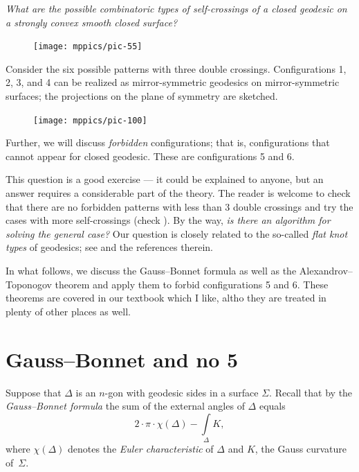 \documentclass[oneside,a4paper]{amsart}
\begin{document}
\medskip

\emph{What are the possible combinatoric types of self-crossings of a closed geodesic on a strongly convex smooth closed surface?}

\begin{figure}[ht!]
\begin{center}
\texttt{[image: mppics/pic-55]}
\end{center}
\end{figure}

Consider the six possible patterns with three double crossings.
Configurations 1, 2, 3, and 4 can be realized as mirror-symmetric geodesics on mirror-symmetric surfaces; the projections on the plane of symmetry are sketched.
\begin{figure}[ht!]
\begin{center}
\texttt{[image: mppics/pic-100]}
\end{center}
\end{figure}

Further, we will discuss \emph{forbidden} configurations;
that is, configurations that cannot appear for closed geodesic.
These are configurations 5 and 6.

This question is a good exercise --- it could be explained to anyone, but an answer requires a considerable part of the theory.
The reader is welcome to check that there are no forbidden patterns with less than 3 double crossings and
try the cases with more self-crossings (check \cite[Figures 15--17]{arnold}).
By the way, \emph{is there an algorithm for solving the general case?} 
Our question is closely related to the so-called \emph{flat knot types} of geodesics;
see \cite{angenent} and the references therein.

In what follows, we discuss the Gauss--Bonnet formula as well as the Alexandrov--Toponogov theorem and apply them to forbid configurations 5 and 6.
These theorems are covered in our textbook \cite{petrunin-zamora} which I like, altho they are treated in plenty of other places as well.

\section*{Gauss--Bonnet and no 5}

Suppose that $\Delta$ is an $n$-gon with geodesic sides in a surface $\Sigma$.
Recall that by the \emph{Gauss--Bonnet formula} the sum of the external angles of $\Delta$ equals
\[2\cdot\pi\cdot\chi(\Delta)-\int\limits_\Delta K,\]
where $\chi(\Delta)$ denotes the \emph{Euler characteristic} of $\Delta$ and $K$, the Gauss curvature of~$\Sigma$.
\end{document}
